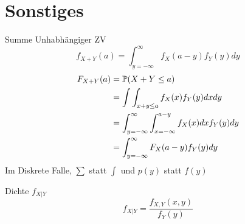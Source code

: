 \section*{Sonstiges}

\begin{mainbox}{Summe Unhabhängiger ZV}
    $$f_{X+Y}(a) = \int_{y=-\infty}^{\infty} f_X(a - y)f_Y(y) dy$$
    \begin{align*}
        F_{X+Y}(a) & = \mathbb{P}(X+Y \leq a) \\
        & = \int \int_{x + y \leq a} f_X (x) f_Y(y) dx dy \\
        & = \int_{y = - \infty}^\infty \int_{x = -\infty}^{a - y} f_X(x) dx f_Y(y) dy \\
        & = \int_{y=-\infty}^{\infty} F_X(a - y)f_Y(y) dy
    \end{align*}
    Im Diskrete Falle, $\sum$ statt $\int$ und $p(y)$ statt $f(y)$
\end{mainbox}

\begin{mainbox}{Dichte $f_{X|Y}$}
    $$f_{X|Y} = \frac{f_{X, Y}(x, y)}{f_Y(y)}$$
\end{mainbox}